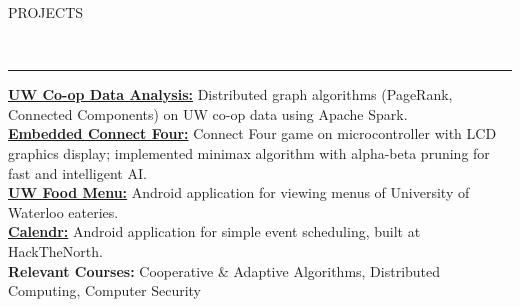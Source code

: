 \documentclass[11pt, letterpaper, oneside]{article}
\newcommand{\HRule}[2]{\textcolor{#1}{\rule{\linewidth}{#2}}}
\newcommand{\sectiontitle}[1]{\begin{minipage}{\textwidth}\vspace{-7.5pt}\begin{flushleft}\hspace{-20.5pt}\vspace{-25pt}
\Large\MakeUppercase{#1}\end{flushleft}\end{minipage}\\\HRule{black}{0.15mm}\vspace{\baselineskip}}
\newenvironment{ressection}[1]{
  \sectiontitle{#1}}
  {\vspace{-\baselineskip}}
\begin{document}
\vspace{4pt}

\begin{ressection}{Projects}\vspace{-12pt}
  \href{https://github.com/coreywu/CoopStatsDataAnalysis}{\textbf{UW Co-op Data Analysis:}} Distributed graph algorithms (PageRank, Connected Components) on UW co-op data using Apache Spark. \vspace{4pt} \\
  \href{https://github.com/coreywu/Connect4}{\textbf{Embedded Connect Four:}} Connect Four game on microcontroller with LCD graphics display; implemented minimax algorithm with alpha-beta pruning for fast and intelligent AI.\vspace{4pt} \\
  \href{https://play.google.com/store/apps/details?id=ca.uwaterloo.uwfoodservices&hl=en}{\textbf{UW Food Menu:}} Android application for viewing menus of University of Waterloo eateries.\vspace{4pt} \\
   \href{http://devpost.com/software/calendr-wq4uf}{\textbf{Calendr:}} Android application for simple event scheduling, built at HackTheNorth.
  \vspace{8pt}\\\hspace{-20pt} \textbf{Relevant Courses:} Cooperative \& Adaptive Algorithms, Distributed Computing, Computer Security
\end{ressection}
\end{document}
